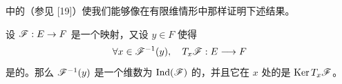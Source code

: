 \trBanachSpace{}中的\trLocalInversionTheorem（参见 [19]）使我们能够像在有限维情形中那样证明下述结果。

\begin{theorem}\label{thm:appC-fredholm-regular-value}
设 $\mathscr{F} : E \to F$ 是一个\trFredholm{}映射，又设 $y \in F$ 使得
\[
\forall x \in \mathscr{F}^{-1}(y), \quad T_x\mathscr{F} : E \longrightarrow F
\]
是\trSurjective{}的。那么 $\mathscr{F}^{-1}(y)$ 是一个维数为 $\operatorname{Ind}(\mathscr{F})$ 的\trManifold，并且它在 $x$ 处的\trTangentSpace{}是 $\operatorname{Ker} T_x\mathscr{F}$。
\end{theorem}
